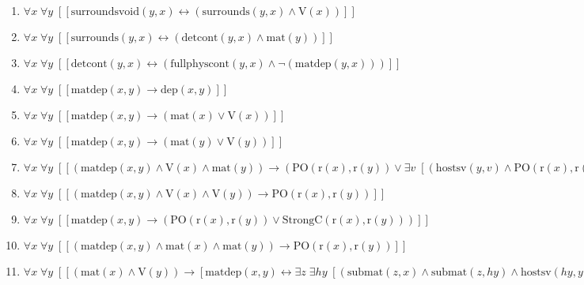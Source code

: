 \documentclass{article}
\begin{document}
\begin{enumerate}
\item $\forall x\; \forall y\;  \left[ \left[ \textrm{surroundsvoid}(y,x) \leftrightarrow \left(\textrm{surrounds}(y,x) \land \textrm{V}(x)\right) \right] \right]$
\item $\forall x\; \forall y\;  \left[ \left[ \textrm{surrounds}(y,x) \leftrightarrow \left(\textrm{detcont}(y,x) \land \textrm{mat}(y)\right) \right] \right]$
\item $\forall x\; \forall y\;  \left[ \left[ \textrm{detcont}(y,x) \leftrightarrow \left(\textrm{fullphyscont}(y,x) \land \neg \left(\textrm{matdep}(y,x)\right)\right) \right] \right]$
\item $\forall x\; \forall y\;  \left[ \left[ \textrm{matdep}(x,y) \rightarrow \textrm{dep}(x,y) \right] \right]$
\item $\forall x\; \forall y\;  \left[ \left[ \textrm{matdep}(x,y) \rightarrow \left(\textrm{mat}(x) \lor \textrm{V}(x)\right) \right] \right]$
\item $\forall x\; \forall y\;  \left[ \left[ \textrm{matdep}(x,y) \rightarrow \left(\textrm{mat}(y) \lor \textrm{V}(y)\right) \right] \right]$
\item $\forall x\; \forall y\;  \left[ \left[ \left(\textrm{matdep}(x,y) \land \textrm{V}(x) \land \textrm{mat}(y)\right) \rightarrow \left(\textrm{PO}(\textrm{r}(x),\textrm{r}(y)) \lor \exists v\;  \left[ \left(\textrm{hostsv}(y,v) \land \textrm{PO}(\textrm{r}(x),\textrm{r}(v))\right) \right]\right) \right] \right]$
\item $\forall x\; \forall y\;  \left[ \left[ \left(\textrm{matdep}(x,y) \land \textrm{V}(x) \land \textrm{V}(y)\right) \rightarrow \textrm{PO}(\textrm{r}(x),\textrm{r}(y)) \right] \right]$
\item $\forall x\; \forall y\;  \left[ \left[ \textrm{matdep}(x,y) \rightarrow \left(\textrm{PO}(\textrm{r}(x),\textrm{r}(y)) \lor \textrm{StrongC}(\textrm{r}(x),\textrm{r}(y))\right) \right] \right]$
\item $\forall x\; \forall y\;  \left[ \left[ \left(\textrm{matdep}(x,y) \land \textrm{mat}(x) \land \textrm{mat}(y)\right) \rightarrow \textrm{PO}(\textrm{r}(x),\textrm{r}(y)) \right] \right]$
\item $\forall x\; \forall y\;  \left[ \left[ \left(\textrm{mat}(x) \land \textrm{V}(y)\right) \rightarrow \left[ \textrm{matdep}(x,y) \leftrightarrow \exists z\; \exists hy\;  \left[ \left(\textrm{submat}(z,x) \land \textrm{submat}(z,hy) \land \textrm{hostsv}(hy,y) \land \left(\textrm{StrongC}(\textrm{r}(z),\textrm{r}(y)) \lor \textrm{PO}(\textrm{r}(z),\textrm{r}(y))\right)\right) \right] \right] \right] \right]$

\end{enumerate}
\end{document}
